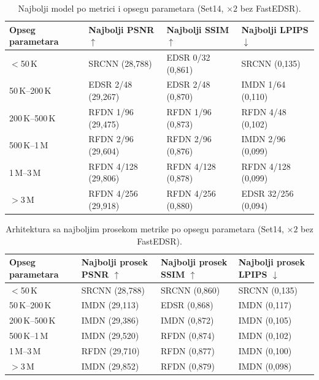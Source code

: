 
\begin{table}[H]
    \centering
    \caption{Najbolji model po metrici i opsegu parametara (Set14, $\times2$ bez FastEDSR).}
    \label{tab:param_bins_best_model_2x_Set14}
    \small
    \setlength{\tabcolsep}{4pt}
    \begin{tabular}{@{}llll@{}}
        \toprule
        Opseg parametara & Najbolji PSNR $\uparrow$ & Najbolji SSIM $\uparrow$ & Najbolji LPIPS $\downarrow$ \\
        \midrule
        $<$50\,K & SRCNN (28,788) & EDSR 0/32 (0,861) & SRCNN (0,135) \\
        50\,K--200\,K & EDSR 2/48 (29,267) & EDSR 2/48 (0,870) & IMDN 1/64 (0,110) \\
        200\,K--500\,K & RFDN 1/96 (29,475) & RFDN 1/96 (0,873) & RFDN 4/48 (0,102) \\
        500\,K--1\,M & RFDN 2/96 (29,604) & RFDN 2/96 (0,876) & IMDN 2/96 (0,099) \\
        1\,M--3\,M & RFDN 4/128 (29,806) & RFDN 4/128 (0,878) & RFDN 4/128 (0,099) \\
        $>$3\,M & RFDN 4/256 (29,918) & RFDN 4/256 (0,880) & EDSR 32/256 (0,094) \\
        \bottomrule
    \end{tabular}
\end{table}

\begin{table}[H]
    \centering
    \caption{Arhitektura sa najboljim prosekom metrike po opsegu parametara (Set14, $\times2$ bez FastEDSR).}
    \label{tab:param_bins_best_arch_2x_Set14}
    \small
    \setlength{\tabcolsep}{4pt}
    \begin{tabular}{@{}llll@{}}
        \toprule
        Opseg parametara & Najbolji prosek PSNR $\uparrow$ & Najbolji prosek SSIM $\uparrow$ & Najbolji prosek LPIPS $\downarrow$ \\
        \midrule
        $<$50\,K & SRCNN (28,788) & SRCNN (0,860) & SRCNN (0,135) \\
        50\,K--200\,K & IMDN (29,113) & EDSR (0,868) & IMDN (0,117) \\
        200\,K--500\,K & IMDN (29,386) & IMDN (0,872) & IMDN (0,105) \\
        500\,K--1\,M & IMDN (29,520) & RFDN (0,874) & IMDN (0,102) \\
        1\,M--3\,M & RFDN (29,710) & RFDN (0,877) & IMDN (0,100) \\
        $>$3\,M & IMDN (29,852) & RFDN (0,879) & IMDN (0,098) \\
        \bottomrule
    \end{tabular}
\end{table}

